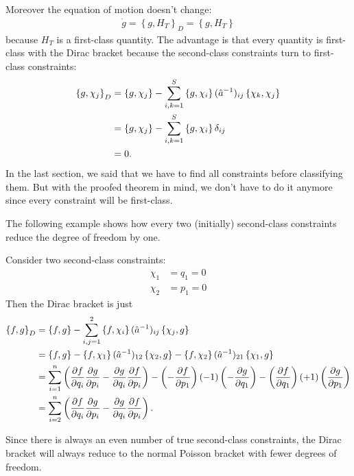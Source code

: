 Moreover the equation of motion doesn't change:
\begin{align}
\dot{g} = \left \{ g,H_T \right \}_D = \left \{ g,H_T \right \}
\end{align}
because $H_T$ is a first-class quantity.
The advantage is that every quantity is first-class with the Dirac bracket because the second-class constraints turn to first-class constraints:
\begin{align}
\left \{ g, \chi_j \right \}_D &= \left\{ g,\chi_j \right\} - \sum_{i,k = 1}^S \left\{ g,\chi_i \right\} (\hat{a}^{-1})_{ij} \left\{ \chi_k,\chi_j \right\} \notag \\
&= \left\{ g,\chi_j \right\} - \sum_{i,k = 1}^S \left\{ g,\chi_i \right\} \delta_{ij} \notag \\
&= 0.
\end{align}
In the last section, we said that we have to find all constraints before classifying them. But with the proofed theorem in mind, we don't have to do it anymore since every constraint will be first-class. 

\pagebreak

The following example shows how every two (initially) second-class constraints reduce the degree of freedom by one.

\begin{example}
Consider two second-class constraints:
\begin{align}
\chi_1 &= q_1 = 0 \\
\chi_2 &= p_1 = 0
\end{align}
Then the Dirac bracket is just
\begin{align}
\left \{ f,g \right \}_D &= \left \{ f,g \right \} - \sum_{i,j = 1}^2 \left\{ f,\chi_i \right\} (\hat{a}^{-1})_{ij} \left\{ \chi_j,g \right\} \notag \\
&= \left \{ f,g \right \} - \left\{ f,\chi_1 \right\} (\hat{a}^{-1})_{12} \left\{ \chi_2,g \right\} - \left\{ f,\chi_2 \right\} (\hat{a}^{-1})_{21} \left\{ \chi_1,g \right\} \notag \\
&= \sum_{i=1}^n \left( \frac{\partial f}{\partial q_i} \frac{\partial g}{\partial p_i} - \frac{\partial g}{\partial q_i} \frac{\partial f}{\partial p_i} \right) - \left( - \frac{\partial f}{\partial p_1} \right) (-1) \left( - \frac{\partial g}{\partial q_1} \right) - \left( \frac{\partial f}{\partial q_1} \right) (+1) \left( \frac{\partial g}{\partial p_1} \right) \notag \\
&= \sum_{i=2}^n \left( \frac{\partial f}{\partial q_i} \frac{\partial g}{\partial p_i} - \frac{\partial g}{\partial q_i} \frac{\partial f}{\partial p_i} \right).
\end{align}
\end{example}

Since there is always an even number of true second-class constraints, the Dirac bracket will always reduce to the normal Poisson bracket with fewer degrees of freedom.